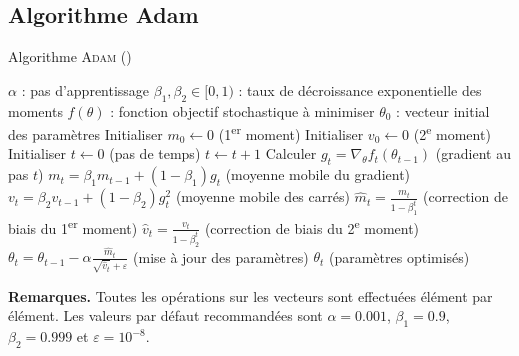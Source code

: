 \documentclass[a4paper,12pt]{article}
\begin{document}
\subsection{Algorithme Adam}

\begin{algorithm}[h]
\caption{Algorithme \textsc{Adam} (\cite{kingma2014})}
\begin{algorithmic}[1]
\REQUIRE $\alpha$ : pas d'apprentissage
\REQUIRE $\beta_1, \beta_2 \in [0,1)$ : taux de décroissance exponentielle des moments
\REQUIRE $f(\theta)$ : fonction objectif stochastique à minimiser
\REQUIRE $\theta_0$ : vecteur initial des paramètres
\STATE Initialiser $m_0 \leftarrow 0$ (1\textsuperscript{er} moment)
\STATE Initialiser $v_0 \leftarrow 0$ (2\textsuperscript{e} moment)
\STATE Initialiser $t \leftarrow 0$ (pas de temps)
    \STATE $t \leftarrow t + 1$
    \STATE Calculer $g_t = \nabla_\theta f_t(\theta_{t-1})$ \hfill (gradient au pas $t$)
    \STATE $m_t = \beta_1 m_{t-1} + (1 - \beta_1) g_t$ \hfill (moyenne mobile du gradient)
    \STATE $v_t = \beta_2 v_{t-1} + (1 - \beta_2) g_t^2$ \hfill (moyenne mobile des carrés)
    \STATE $\hat{m}_t = \frac{m_t}{1 - \beta_1^t}$ \hfill (correction de biais du 1\textsuperscript{er} moment)
    \STATE $\hat{v}_t = \frac{v_t}{1 - \beta_2^t}$ \hfill (correction de biais du 2\textsuperscript{e} moment)
    \STATE $\theta_t = \theta_{t-1} - \alpha \frac{\hat{m}_t}{\sqrt{\hat{v}_t} + \varepsilon}$ \hfill (mise à jour des paramètres)
\ENDWHILE
\RETURN $\theta_t$ (paramètres optimisés)
\end{algorithmic}
\end{algorithm}

\noindent\textbf{Remarques.} Toutes les opérations sur les vecteurs sont effectuées élément par élément.
Les valeurs par défaut recommandées sont $\alpha = 0{.}001$,
$\beta_1 = 0{.}9$, $\beta_2 = 0{.}999$ et $\varepsilon = 10^{-8}$.

\printbibliography
\end{document}
